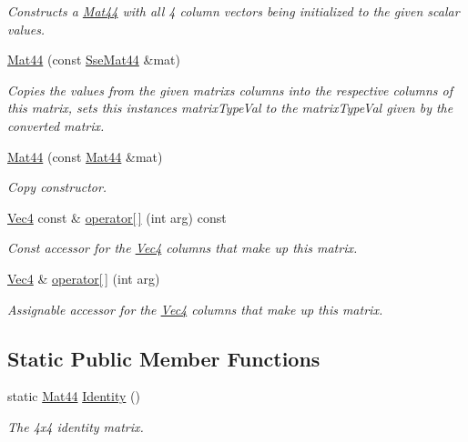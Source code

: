 \begin{DoxyCompactItemize}
\begin{DoxyCompactList}\small\item\em Constructs a \hyperlink{classgfxmath_1_1_mat44}{Mat44} with all 4 column vectors being initialized to the given scalar values. \end{DoxyCompactList}\item 
\hyperlink{classgfxmath_1_1_mat44_a8fafc4c0ac33fb5a3589c43466d1b0c7}{Mat44} (const \hyperlink{classgfxmath_1_1_sse_mat44}{Sse\+Mat44} \&mat)
\begin{DoxyCompactList}\small\item\em Copies the values from the given matrix\textquotesingle{}s columns into the respective columns of this matrix, sets this instance\textquotesingle{}s matrix\+Type\+Val to the matrix\+Type\+Val given by the converted matrix. \end{DoxyCompactList}\item 
\hyperlink{classgfxmath_1_1_mat44_abcebf9e54a3a7954d4f870d1e076517a}{Mat44} (const \hyperlink{classgfxmath_1_1_mat44}{Mat44} \&mat)
\begin{DoxyCompactList}\small\item\em Copy constructor. \end{DoxyCompactList}\item 
\hyperlink{classgfxmath_1_1_vec4}{Vec4} const \& \hyperlink{classgfxmath_1_1_mat44_afa2fba80f3d058c256de19aa52106b75}{operator\mbox{[}$\,$\mbox{]}} (int arg) const 
\begin{DoxyCompactList}\small\item\em Const accessor for the \hyperlink{classgfxmath_1_1_vec4}{Vec4} columns that make up this matrix. \end{DoxyCompactList}\item 
\hyperlink{classgfxmath_1_1_vec4}{Vec4} \& \hyperlink{classgfxmath_1_1_mat44_afca7649a550e6f60443710a586b59cb5}{operator\mbox{[}$\,$\mbox{]}} (int arg)
\begin{DoxyCompactList}\small\item\em Assignable accessor for the \hyperlink{classgfxmath_1_1_vec4}{Vec4} columns that make up this matrix. \end{DoxyCompactList}\end{DoxyCompactItemize}
\subsection*{Static Public Member Functions}
\begin{DoxyCompactItemize}
\item 
static \hyperlink{classgfxmath_1_1_mat44}{Mat44} \hyperlink{classgfxmath_1_1_mat44_affaa1c0f2a0746b7d15d02a970590764}{Identity} ()
\begin{DoxyCompactList}\small\item\em The 4x4 identity matrix. \end{DoxyCompactList}\end{DoxyCompactItemize}
